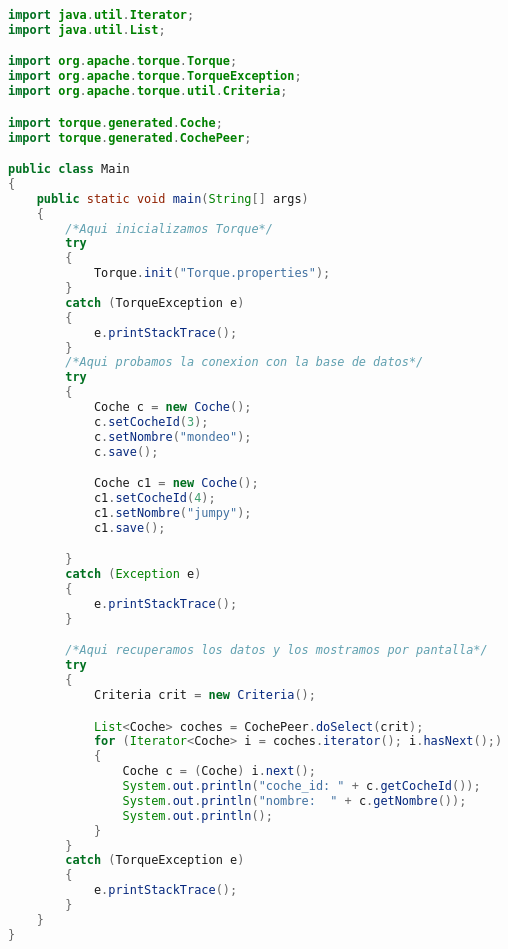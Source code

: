 \begin{lstlisting}[language=java]
import java.util.Iterator;
import java.util.List;

import org.apache.torque.Torque;
import org.apache.torque.TorqueException;
import org.apache.torque.util.Criteria;

import torque.generated.Coche;
import torque.generated.CochePeer;

public class Main 
{
	public static void main(String[] args)
	{
		/*Aqui inicializamos Torque*/
		try
		{
			Torque.init("Torque.properties");
		} 
		catch (TorqueException e) 
		{	
			e.printStackTrace();
		}
		/*Aqui probamos la conexion con la base de datos*/
		try 
		{
			Coche c = new Coche();
			c.setCocheId(3);
			c.setNombre("mondeo");
			c.save();

			Coche c1 = new Coche();
			c1.setCocheId(4);
			c1.setNombre("jumpy");
			c1.save();

		} 
		catch (Exception e) 
		{
			e.printStackTrace();
		}

		/*Aqui recuperamos los datos y los mostramos por pantalla*/
		try 
		{
			Criteria crit = new Criteria();

			List<Coche> coches = CochePeer.doSelect(crit);
			for (Iterator<Coche> i = coches.iterator(); i.hasNext();)
			{
				Coche c = (Coche) i.next();
				System.out.println("coche_id: " + c.getCocheId());
				System.out.println("nombre:  " + c.getNombre()); 
				System.out.println();
			}
		} 
		catch (TorqueException e) 
		{
			e.printStackTrace();
		}
	}
}
\end{lstlisting}